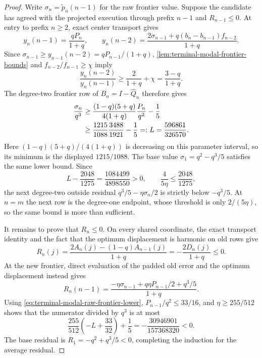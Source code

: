 \begin{proof}
Write $\sigma_n=\widetilde p_n(n-1)$ for the raw frontier value.  Suppose the
candidate has agreed with the projected execution through prefix $n-1$ and
$R_{n-1}\le0$.  At entry to prefix $n\ge2$, exact center transport gives
\[
 y_n(n-1)=\frac{qP_n}{1+q},\qquad
 y_n(n-2)=\frac{2\sigma_{n-1}
                 +q(b_n-b_{n-1})f_{n-2}}{1+q}.
\]
Since $\sigma_{n-1}\ge y_{n-1}(n-2)=qP_{n-1}/(1+q)$,
\cref{lem:terminal-modal-frontier-bounds} and
$f_{n-2}/f_{n-1}\ge\chi$ imply
\begin{equation}
 \frac{y_n(n-2)}{y_n(n-1)}
 \ge\frac2{1+q}+\chi=\frac{3-q}{1+q}.
 \label{eq:terminal-modal-frontier-ratio}
\end{equation}
The degree-two frontier row of $B_n=I-\widehat Q_n$ therefore gives
\begin{align}
 \frac{\sigma_n}{q^3}
 &\ge \frac{(1-q)(5+q)}{4(1+q)}\frac{P_n}{q^2}-\frac15
 \notag\\
 &\ge \frac{1215}{1088}\frac{3488}{1921}-\frac15
 =:L=\frac{596861}{326570}.
 \label{eq:terminal-modal-raw-frontier-lower}
\end{align}
Here $(1-q)(5+q)/(4(1+q))$ is decreasing on this parameter interval, so its
minimum is the displayed $1215/1088$.
The base value $\sigma_1=q^2-q^3/5$ satisfies the same lower bound.  Since
\[
 L-\frac{2048}{1275}
 =\frac{1084499}{4898550}>0,
 \qquad
 \frac4{5\eta}\le\frac{2048}{1275},
\]
the next degree-two outside residual
$q^3/5-\eta\sigma_n/2$ is strictly below $-q^3/5$.  At $n=m$ the next row is
the degree-one endpoint, whose threshold is only $2/(5\eta)$, so the same
bound is more than sufficient.

It remains to prove that $R_n\le0$.  On every shared coordinate, the exact
transport identity and the fact that the optimum displacement is harmonic on
old rows give
\begin{equation}
 R_n(j)=\frac{2A_n(j)-(1-q)A_{n-1}(j)}{1+q}
       =-\frac{2D_n(j)}{1+q}\le0.
 \label{eq:terminal-modal-shared-average-residual}
\end{equation}
At the new frontier, direct evaluation of the padded old error and the
optimum displacement instead gives
\begin{equation}
 R_n(n-1)=\frac{-\eta\sigma_{n-1}
                 +q\eta P_{n-1}/2+q^3/5}{1+q}.
 \label{eq:terminal-modal-frontier-average-residual}
\end{equation}
Using \eqref{eq:terminal-modal-raw-frontier-lower},
$P_{n-1}/q^2\le33/16$, and $\eta\ge255/512$ shows that the numerator divided
by $q^3$ is at most
\[
 \frac{255}{512}\left(-L+\frac{33}{32}\right)+\frac15
 =-\frac{30946901}{157368320}<0.
\]
The base residual is $R_1=-q^2+q^3/5<0$, completing the induction for the
average residual.


\end{proof}
